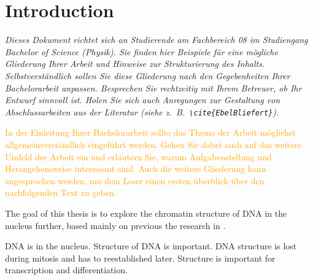 \documentclass[a4paper,11pt,oneside,final,english,toc=bib,draft]{scrbook}
\begin{document}
\tableofcontents
\clearpage

\mainmatter
\sloppy

% 
\chapter{Introduction} %
\label{cha:introduction}

{\em Dieses Dokument richtet sich an Studierende am Fachbereich 08 im 
Studiengang Bachelor of Science (Physik). Sie finden hier Beispiele 
für eine mögliche Gliederung Ihrer Arbeit und Hinweise zur 
Strukturierung des Inhalts. Selbstverständlich sollen Sie diese 
Gliederung nach den Gegebenheiten Ihrer Bachelorarbeit anpassen. 
Besprechen Sie rechtzeitig mit Ihrem Betreuer, ob Ihr Entwurf sinnvoll 
ist. Holen Sie sich auch Anregungen zur Gestaltung von Abschlussarbeiten 
aus der Literatur (siehe z.\ B.\ \verb|\cite{EbelBliefert}|).}

\medskip

\textcolor{orange}{In der Einleitung Ihrer Bachelorarbeit sollte das Thema der Arbeit 
möglichst allgemeinverständlich eingeführt werden. Gehen Sie 
dabei auch auf das weitere Umfeld der Arbeit ein und erläutern Sie, 
warum Aufgabenstellung und Herangehensweise interessant sind. Auch 
die weitere Gliederung kann angesprochen werden, um dem Leser einen 
ersten überblick über den nachfolgenden Text zu geben.}

\bigskip

The goal of this thesis is to explore the chromatin structure of DNA in the nucleus further, based mainly on previous the research in \cite{wettermann_minimal_2020}.

DNA is in the nucleus. Structure of DNA is important. DNA structure is lost during mitosis and has to reestablished later. Structure is important for transcription and differentiation.

\bigskip




\end{document}

